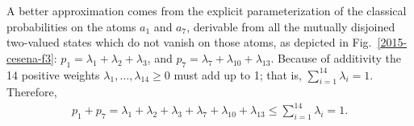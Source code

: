 A better approximation comes from the explicit parameterization of the classical probabilities on the atoms $a_1$ and $a_7$,
derivable from all the mutually disjoined two-valued states which do not vanish on those atoms,
as depicted in Fig.~\ref{2015-cesena-f3}:
$p_1= \lambda_1 + \lambda_2 + \lambda_3$, and
$p_7= \lambda_7 + \lambda_{10} + \lambda_{13}$.
Because of additivity the 14 positive weights $\lambda_{1},\ldots ,\lambda_{14} \ge 0$
must add up to 1; that is, $\sum_{i=1}^{14} \lambda_{i}=1$.
Therefore,
\begin{equation}
\begin{split}
p_{1} + p_{7}
= \lambda_1 + \lambda_2 + \lambda_3 + \lambda_7 + \lambda_{10} + \lambda_{13}
\le \sum_{i=1}^{14} \lambda_{i}=1
.
\end{split}
\label{2017-b-spbp17}
\end{equation}


